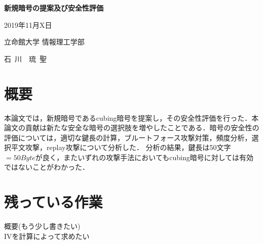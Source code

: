 \documentclass[a4p]{jarticle}
\begin{document}
\thispagestyle{empty}
\begin{center}
\vspace*{4.5cm}
{\huge\bf 新規暗号の提案及び安全性評価}
\vspace*{3cm}

{\large 2019年11月X日}
\vspace*{3cm}

{\large 立命館大学 情報理工学部}
\vspace*{5mm}

{\Large 石~川~~琉~聖}
\end{center}
\newpage 

\setcounter{page}{1}

\section*{概要}

本論文では，新規暗号であるcubing暗号を提案し，その安全性評価を行った．本論文の貢献は新たな安全な暗号の選択肢を増やしたことである．暗号の安全性の評価については，適切な鍵長の計算，ブルートフォース攻撃対策，頻度分析，選択平文攻撃，replay攻撃について分析した．
分析の結果，鍵長は50文字$=50Byte$が良く，またいずれの攻撃手法においてもcubing暗号に対しては有効ではないことがわかった．

\newpage

\tableofcontents
\clearpage
\section{残っている作業}
概要(もう少し書きたい)\\
IVを計算によって求めたい\\
\end{document}
